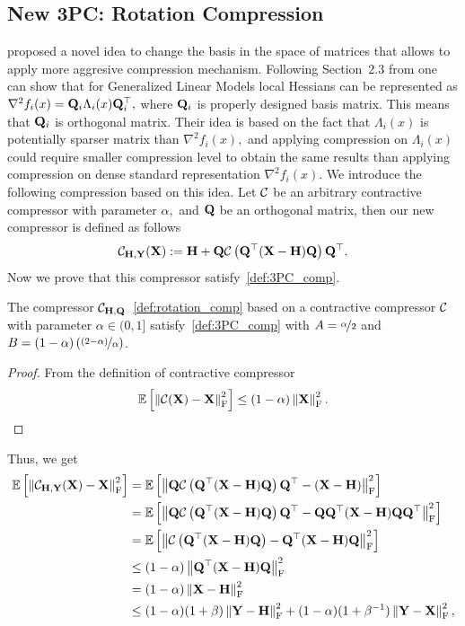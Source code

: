\documentclass[11pt]{article}
\begin{document}
	\subsection{New 3PC: Rotation Compression}\label{apx:rot-comp}
	
	\citep{qian2021basis} proposed a novel idea to change the basis in the space of matrices that allows to apply more aggresive compression mechanism. Following Section~$2.3$ from \citep{qian2021basis} one can show that for Generalized Linear Models local Hessians can be represented as $\nabla^2f_i(x) = \mathbf{Q}_i\Lambda_i(x)\mathbf{Q}_i^\top,$ where $\mathbf{Q}_i$ is properly designed basis matrix. This means that $\mathbf{Q}_i$ is orthogonal matrix. Their idea is based on the fact that $\Lambda_i(x)$ is potentially sparser matrix than $\nabla^2f_i(x),$ and applying compression on $\Lambda_i(x)$ could require smaller compression level to obtain the same results than applying compression on dense standard representation $\nabla^2f_i(x).$ We introduce the following compression based on this idea. Let ${\mathcal{C}}$ be an arbitrary contractive compressor with parameter $\alpha,$ and $\mathbf{Q}$ be an orthogonal matrix, then our new compressor is defined as follows 
	\begin{equation}\label{def:rotation_comp}
		{\mathcal{C}}_{\mathbf{H},\mathbf{Y}}(\mathbf{X}) \; { := }\; \mathbf{H} + \mathbf{Q}{\mathcal{C}}\left(\mathbf{Q}^\top(\mathbf{X}-\mathbf{H})\mathbf{Q}\right)\mathbf{Q}^\top.
	\end{equation}
	Now we prove that this compressor satisfy~\eqref{def:3PC_comp}.
	\begin{lemma}
		The compressor ${\mathcal{C}}_{\mathbf{H},\mathbf{Q}}$~\eqref{def:rotation_comp} based on a contractive compressor ${\mathcal{C}}$ with parameter $\alpha\in(0,1]$ satisfy~\eqref{def:3PC_comp} with $A=\nicefrac{\alpha}{2}$ and $B=(1-\alpha)\left(\nicefrac{(2-\alpha)}{\alpha}\right)$.
	\end{lemma}
	\begin{proof}
		From the definition of contractive compressor
		$$\mathbb{E}\left[\left\|{\mathcal{C}}(\mathbf{X})-\mathbf{X}\right\|^2_{\rm F}\right] \leq (1-\alpha)\left\|\mathbf{X}\right\|^2_{\rm F}.$$
	\end{proof}
	Thus, we get
	\begin{align*}
		\mathbb{E}\left[\left\|{\mathcal{C}}_{\mathbf{H},\mathbf{Y}}(\mathbf{X}) - \mathbf{X}\right\|^2_{\rm F}\right] &= \mathbb{E}\left[\left\|\mathbf{Q}{\mathcal{C}}\left(\mathbf{Q}^\top(\mathbf{X}-\mathbf{H})\mathbf{Q}\right)\mathbf{Q}^\top - (\mathbf{X}-\mathbf{H})\right\|^2_{\rm F}\right]\\
		&=\mathbb{E}\left[\left\|\mathbf{Q}{\mathcal{C}}\left(\mathbf{Q}^\top(\mathbf{X}-\mathbf{H})\mathbf{Q}\right)\mathbf{Q}^\top - \mathbf{Q}\mathbf{Q}^\top(\mathbf{X}-\mathbf{H})\mathbf{Q}\mathbf{Q}^\top\right\|^2_{\rm F}\right]\\
		&=\mathbb{E}\left[\left\|{\mathcal{C}}\left(\mathbf{Q}^\top(\mathbf{X}-\mathbf{H})\mathbf{Q}\right) -\mathbf{Q}^\top(\mathbf{X}-\mathbf{H})\mathbf{Q}\right\|^2_{\rm F}\right]\\
		&\leq (1-\alpha)\left\|\mathbf{Q}^\top(\mathbf{X}-\mathbf{H})\mathbf{Q}\right\|^2_{\rm F}\\
		&= (1-\alpha)\left\|\mathbf{X}-\mathbf{H}\right\|^2_{\rm F}\\
		&\leq (1-\alpha)(1+\beta)\left\|\mathbf{Y}-\mathbf{H}\right\|^2_{\rm F} + (1-\alpha)(1+\beta^{-1})\left\|\mathbf{Y}-\mathbf{X}\right\|^2_{\rm F},
	\end{align*}
\end{document}
